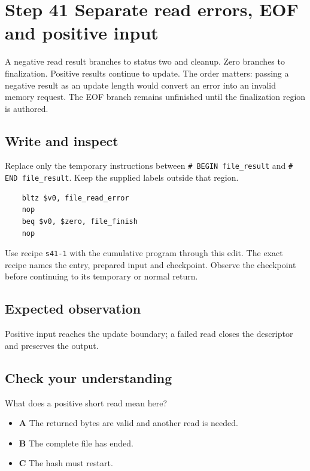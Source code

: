 \section{Step 41 Separate read errors, EOF and positive input}\label{sha-s41}

A negative read result branches to status two and cleanup. Zero branches to finalization. Positive results continue to update. The order matters: passing a negative result as an update length would convert an error into an invalid memory request. The EOF branch remains unfinished until the finalization region is authored.

\subsection{Write and inspect}
Replace only the temporary instructions between \texttt{\# BEGIN file\_result} and \texttt{\# END file\_result}. Keep the supplied labels outside that region.

\begin{verbatim}
    bltz $v0, file_read_error
    nop
    beq $v0, $zero, file_finish
    nop
\end{verbatim}

Use recipe \texttt{s41-1} with the cumulative program through this edit. The exact recipe names the entry, prepared input and checkpoint. Observe the checkpoint before continuing to its temporary or normal return.

\subsection{Expected observation}
Positive input reaches the update boundary; a failed read closes the descriptor and preserves the output.

\subsection{Check your understanding}
What does a positive short read mean here?

\begin{itemize}
  \item \textbf{A} The returned bytes are valid and another read is needed.
  \item \textbf{B} The complete file has ended.
  \item \textbf{C} The hash must restart.
\end{itemize}
